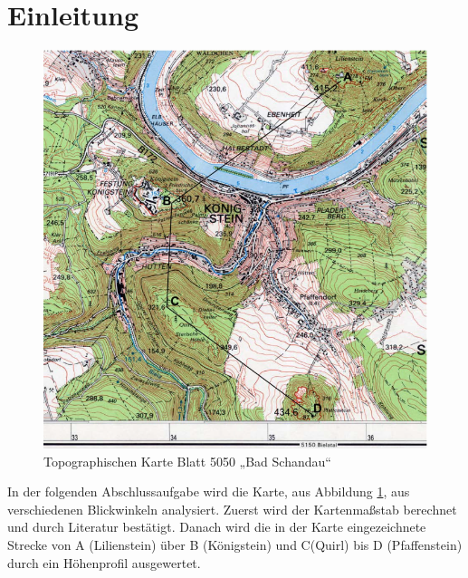 \section{Einleitung}
\setcounter{page}{1}

\begin{figure}[h]
    \centering
    \includegraphics[scale = 0.5]{Abbildungen/5050_badschandau.png}
    \caption{Topographischen Karte Blatt 5050 „Bad Schandau“ \cite{landesvermessungsamt_sachsen_topographische_2009}}
    \label{fig:abb1}
\end{figure}

In der folgenden Abschlussaufgabe wird die Karte, aus Abbildung \ref{fig:abb1}, aus verschiedenen Blickwinkeln analysiert. Zuerst wird der Kartenmaßstab berechnet und durch Literatur bestätigt. Danach wird die in der Karte eingezeichnete Strecke von A (Lilienstein) über B (Königstein) und C(Quirl) bis D (Pfaffenstein) durch ein Höhenprofil ausgewertet.